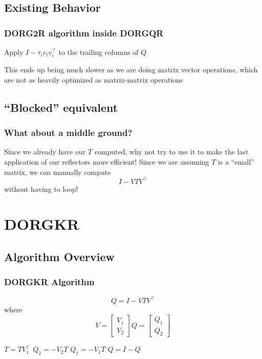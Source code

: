 \documentclass[12pt]{beamer}
\begin{document}
    \subsection{Existing Behavior}
    \begin{frame}
        \frametitle{DORG2R algorithm inside DORGQR}
        \begin{algorithmic}
            \State Apply $I-\tau_iv_iv_i^\top$ to the trailing columns of $Q$
            \EndFor
        \end{algorithmic}
        This ends up being much slower as we are doing matrix vector operations, which are not as
        heavily optimized as matrix-matrix operations
    \end{frame}
    \subsection{``Blocked'' equivalent}
    \begin{frame}
        \frametitle{What about a middle ground?}
        Since we already have our $T$ computed, why not try to use it to make the last application of our reflectors
        more efficient! Since we are assuming $T$ is a ``small'' matrix, we can manually compute 
        $$
            I - VTV^\top
        $$
        without having to loop!
    \end{frame}
    \section{DORGKR}
    \subsection{Algorithm Overview}
    \begin{frame}
        \frametitle{DORGKR Algorithm}
        $$
            Q = I - VTV^\top
        $$ where
        $$
        V = \begin{bmatrix} V_1 \\ V_2 \end{bmatrix}
        Q = \begin{bmatrix} Q_1 \\ Q_2 \end{bmatrix}
        $$
        \begin{algorithmic}
            \State $T = TV_1^\top$
            \State $Q_2 = -V_2T$
            \State $Q_1 = -V_1T$
            \State $Q = I - Q$
        \end{algorithmic}
    \end{frame}
\end{document}
